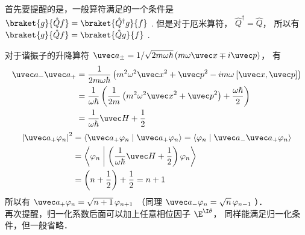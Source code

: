 
首先要提醒的是，一般算符满足的一个条件是 $\braket{g}{\hat Q f}=\braket{\hat Q^\dagger g}{ f}$ . 但是对于厄米算符， ${\hat Q^\dagger } = \hat Q$，  所以有 $\braket{g}{\hat Q f} = \braket{\hat Q g}{f}$ .

对于谐振子的升降算符 ${\uvec a_ \pm } = {1}/{\sqrt {2m\omega \hbar } }\left( {m\omega \uvec x \mp i\uvec p} \right)$， 有
\begin{equation}\begin{aligned}
{\uvec a_ - }{\uvec a_ + } &= \frac{1}{2m\omega \hbar }\left( {{m^2}{\omega ^2}{{\uvec x}^2} + {{\uvec p}^2} - im\omega {\kern 1pt} {\kern 1pt} [\uvec x,\uvec p]} \right) \\
&= \frac{1}{\omega \hbar }\left( {\frac{1}{2m}\left( {{m^2}{\omega ^2}{{\uvec x}^2} + {{\uvec p}^2}} \right) + \frac{\omega \hbar }{2}} \right) \\
&= \frac{1}{\omega \hbar }\uvec H + \frac12 
\end{aligned}\end{equation}
\begin{equation}\begin{aligned}
{\left| {{{\uvec a}_ + }{\varphi_n}} \right|^2} &= \left\langle {{{\uvec a}_ + }{\varphi_n}}
\mathrel{\left | {\vphantom {{{{\uvec a}_ + }{\varphi_n}} {{{\uvec a}_ + }{\varphi_n}}}}
\right. \kern-\nulldelimiterspace}
{{{\uvec a}_ + }{\varphi_n}} \right\rangle = \left\langle {\varphi_n}
\mathrel{\left | {\vphantom {{\varphi_n} {{{\uvec a}_ - }{{\uvec a}_ + }{\varphi_n}}}}
\right. \kern-\nulldelimiterspace}
{{{\uvec a}_ - }{{\uvec a}_ + }{\varphi_n}} \right\rangle  \\
&= \left\langle {\varphi_n}
\mathrel{\left | {\vphantom {{\varphi_n} {\left( {\frac{1}{\omega \hbar }\uvec H + \frac12} \right){\varphi_n}}}}
\right. \kern-\nulldelimiterspace}
{\left( {\frac{1}{\omega \hbar }\uvec H + \frac12} \right){\varphi_n}} \right\rangle \\
&= \left( {n + \frac12} \right) + \frac12 = n + 1
\end{aligned}\end{equation}
所以有 ${\uvec a_ + }{\varphi_n} = \sqrt {n + 1}\, {\varphi_{n + 1}}$ （同理 ${\uvec a_ - }{\varphi_n} = \sqrt n \,{\varphi_{n - 1}}$ ）．\\
再次提醒，归一化系数后面可以加上任意相位因子 ${\E^{\I\theta }}$， 同样能满足归一化条件，但一般省略．